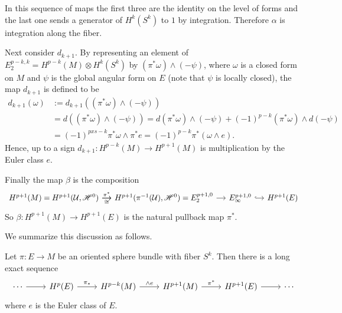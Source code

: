 In this sequence of maps the first three are the identity on the level of forms and the last one sends a generator of $H^k(S^k)$ to $1$ by integration. Therefore $\alpha$ 
is integration along the fiber.\par
Next consider $d_{k+1}$. By representing an element of $E_2^{p-k,k}=H^{p-k}(M)\otimes H^k(S^k)$ by $(\pi^*\omega)\wedge(-\psi)$, where $\omega$ is a closed form on $M$ 
and $\psi$ is the global angular form on $E$ (note that $\psi$ is locally closed), the map $d_{k+1}$ is defined to be
\begin{align*}
d_{k+1}(\omega)&:=d_{k+1}((\pi^*\omega)\wedge(-\psi))\\
&=d((\pi^*\omega)\wedge(-\psi))=d(\pi^*\omega)\wedge(-\psi)+(-1)^{p-k}(\pi^*\omega)\wedge d(-\psi)\\
&=(-1)^{pxs-k}\pi^*\omega\wedge\pi^* e=(-1)^{p-k}\pi^*(\omega\wedge e).
\end{align*}
Hence, up to a sign $d_{k+1}:H^{p-k}(M)\to H^{p+1}(M)$ is multiplication by the Euler class $e$.\par
Finally the map $\beta$ is the composition
\[\begin{tikzcd}[column sep=1.2em]
H^{p+1}(M)=H^{p+1}(\mathcal{U},\mathscr{H}^0)\ar[r,"\pi^*"]\ar[r,swap,"\cong"]&H^{p+1}(\pi^{-1}(\mathcal{U}),\mathscr{H}^0)=E_2^{p+1,0}\ar[r]&E_{\infty}^{p+1,0}\ar[r,hook]&H^{p+1}(E)
\end{tikzcd}\]
So $\beta:H^{p+1}(M)\to H^{p+1}(E)$ is the natural pullback map $\pi^*$.\par
We summarize this discussion as follows.
\begin{theorem}
Let $\pi:E\to M$ be an oriented sphere bundle with fiber $S^k$. Then there is a long exact sequence
\[\begin{tikzcd}
\cdots\ar[r]&H^p(E)\ar[r,"\pi_*"]&H^{p-k}(M)\ar[r,"\wedge e"]&H^{p+1}(M)\ar[r,"\pi^*"]&H^{p+1}(E)\ar[r]&\cdots
\end{tikzcd}\]
where $e$ is the Euler class of $E$.
\end{theorem}
